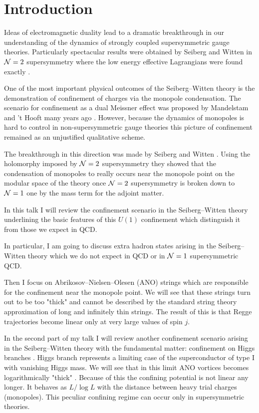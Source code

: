 \documentclass[a4paper,12pt]{article}
\begin{document}
\section{Introduction}

Ideas of electromagnetic  duality \cite{1} lead to a dramatic
breakthrough in our understanding of the dynamics of strongly
coupled supersymmetric gauge theories. Particularly spectacular
results were obtained by Seiberg and Witten in ${\cal N}=2$
supersymmetry where the low energy effective Lagrangians were
found exactly \cite{SW1,SW2}.

One of the most important physical outcomes of the
Seiberg--Witten theory is the demonstration of  confinement
of charges via the monopole condensation. The scenario for
confinement as a dual Meissner effect was proposed by Mandelstam
and 't Hooft many years ago \cite{MH}. However, because the
dynamics of monopoles is hard to control in non-supersymmetric
gauge theories this picture of confinement remained as an
unjustified qualitative scheme.

The breakthrough in this direction was made by Seiberg and
Witten \cite{SW1,SW2}. Using the holomorphy imposed by ${\cal N}=2$
supersymmetry they showed that the condensation of monopoles to
really occurs near the monopole point on the modular space of
the theory once ${\cal N}=2$ supersymmetry is broken down to ${\cal N}=1$ one
by the mass term for the adjoint matter.

In this talk I will review the confinement scenario in the
Seiberg--Witten theory underlining the basic features of this
$U(1)$ confinement which distinguish it from those we expect in
QCD.

In particular, I am going to discuss extra hadron states arising
in the Seiberg--Witten theory which we do not expect in QCD or
in ${\cal N}=1$ supersymmetric QCD.

Then I focus on Abrikosov--Nielsen--Olesen (ANO) strings
\cite{ANO} which are responsible for the confinement near the
monopole point. We will see that these strings turn out to be
too "thick" and cannot be described by the standard string theory
approximation of long and infinitely thin strings. The result of
this is that Regge trajectories become linear only at very large
values of spin $j$.

In the second part of my talk I will review another confinement
scenario arising in the Seiberg--Witten theory with the fundamental
matter: confinement on Higgs branches \cite{SW2}. Higgs branch
represents a limiting case of the superconductor of type I with
vanishing Higgs mass. We will see that in this limit ANO
vortices becomes logarithmically "thick" \cite{Y}. Because of
this the confining potential is not linear any longer. It
behaves as $L/\log L$ with the distance between heavy trial
charges (monopoles). This peculiar confining regime can occur
only in supersymmetric theories.
\end{document}
